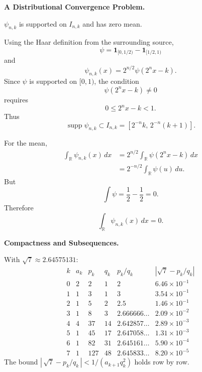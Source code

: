 \begin{problem}[CP-II-0525]
\label{prob:cp-ii-0525}
\textbf{A Distributional Convergence Problem.}

\hspace*{1.5em}$\psi_{n,k}$ is supported on $I_{n,k}$ and has zero mean.
\end{problem}

\begin{solution}
Using the Haar definition from the surrounding source,
\[
\psi
=
\mathbf1_{[0,1/2)}
-
\mathbf1_{[1/2,1)}
\]
and
\[
\psi_{n,k}(x)
=
2^{n/2}\psi(2^nx-k).
\]
Since \(\psi\) is supported on \([0,1)\), the condition
\[
\psi(2^nx-k)\neq0
\]
requires
\[
0\le2^nx-k<1.
\]
Thus
\[
\boxed{
\operatorname{supp}\psi_{n,k}
\subset
I_{n,k}
=
[2^{-n}k,\,2^{-n}(k+1)].
}
\]

For the mean,
\[
\begin{aligned}
\int_{\mathbb R}\psi_{n,k}(x)\,dx
&=
2^{n/2}
\int_{\mathbb R}
\psi(2^nx-k)\,dx\\
&=
2^{-n/2}
\int_{\mathbb R}\psi(u)\,du.
\end{aligned}
\]
But
\[
\int\psi
=
\frac12-\frac12
=
0.
\]
Therefore
\[
\boxed{
\int_{\mathbb R}\psi_{n,k}(x)\,dx=0.
}
\]
\end{solution}


\begin{problem}[CP-II-0526]
\label{prob:cp-ii-0526}
\textbf{Compactness and Subsequences.}

\hspace*{1.5em}With $\sqrt7\approx2.64575131$:
	\[
	\begin{array}{c|c|c|c|c|c}
		k & a_k & p_k & q_k & p_k/q_k & |\sqrt7-p_k/q_k| \\ \hline
		0 & 2 & 2   & 1  & 2                 & 6.46\times10^{-1} \\
		1 & 1 & 3   & 1  & 3                 & 3.54\times10^{-1} \\
		2 & 1 & 5   & 2  & 2.5               & 1.46\times10^{-1} \\
		3 & 1 & 8   & 3  & 2.666666\ldots    & 2.09\times10^{-2} \\
		4 & 4 & 37  & 14 & 2.642857\ldots    & 2.89\times10^{-3} \\
		5 & 1 & 45  & 17 & 2.647058\ldots    & 1.31\times10^{-3} \\
		6 & 1 & 82  & 31 & 2.645161\ldots    & 5.90\times10^{-4} \\
		7 & 1 & 127 & 48 & 2.645833\ldots    & 8.20\times10^{-5}
	\end{array}
	\]
	The bound $|\,\sqrt7-p_k/q_k\,|<1/(a_{k+1}q_k^2)$ holds row by row.
\end{problem}

